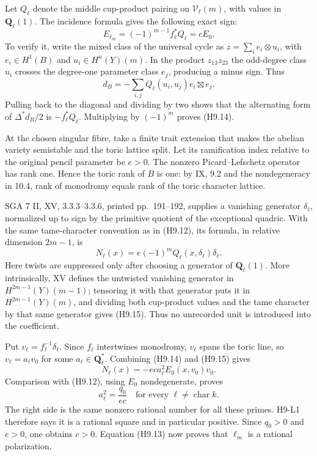 Let $Q_\ell$ denote the middle cup-product pairing on
$\mathcal V_\ell(m)$, with values in $\mathbf Q_\ell(1)$.
The incidence formula gives the following exact sign:
\[
 E_{\ell_m}=(-1)^{m-1}f_\ell^*Q_\ell=cE_0.            \tag{H9.14}
\]
To verify it, write the mixed class of the universal cycle as
$z=\sum_i e_i\otimes u_i$, with $e_i\in H^1(B)$ and
$u_i\in H^n(Y)(m)$. In the product $z_{13}z_{23}$ the odd-degree
class $u_i$ crosses the degree-one parameter class $e_j$, producing
a minus sign. Thus
\[
 d_B=-\sum_{i,j}Q_\ell(u_i,u_j)e_i\boxtimes e_j.
\]
Pulling back to the diagonal and dividing by two shows that the
alternating form of $\Delta^*d_B/2$ is $-f_\ell^*Q_\ell$.
Multiplying by $(-1)^m$ proves (H9.14).

At the chosen singular fibre, take a finite trait extension that makes
the abelian variety semistable and the toric lattice split. Let its
ramification index relative to the original pencil parameter be $e>0$.
The nonzero Picard--Lefschetz operator has rank one. Hence the toric rank
of $B$ is one: by IX, 9.2 and the nondegeneracy in 10.4, rank of monodromy
equals rank of the toric character lattice.

SGA 7 II, XV, 3.3.3--3.3.6, printed pp.~191--192, supplies a vanishing generator
$\delta_\ell$, normalized up to sign by the primitive quotient of the
exceptional quadric. With the same tame-character convention as in
(H9.12), its formula, in relative dimension $2m-1$, is
\[
 N_\ell(x)=e(-1)^m Q_\ell(x,\delta_\ell)\delta_\ell.
                                                        \tag{H9.15}
\]
Here twists are suppressed only after choosing a generator of
$\mathbf Q_\ell(1)$. More intrinsically, XV defines the untwisted
vanishing generator in $H^{2m-1}(Y)(m-1)$; tensoring it with that
generator puts it in $H^{2m-1}(Y)(m)$, and dividing both cup-product
values and the tame character by that same generator gives (H9.15).
Thus no unrecorded unit is introduced into the coefficient.

Put $v_\ell=f_\ell^{-1}\delta_\ell$. Since $f_\ell$ intertwines
monodromy, $v_\ell$ spans the toric line, so
$v_\ell=a_\ell v_0$ for some $a_\ell\in\mathbf Q_\ell^*$.
Combining (H9.14) and (H9.15) gives
\[
 N_\ell(x)=-e c a_\ell^2 E_0(x,v_0)v_0.
\]
Comparison with (H9.12), using $E_0$ nondegenerate, proves
\[
 a_\ell^2=\frac{q_0}{e c}\quad\text{for every }\ell\ne
 \operatorname{char}k.                                \tag{H9.16}
\]
The right side is the same nonzero rational number for all these primes.
H9-L1 therefore says it is a rational square and in particular positive.
Since $q_0>0$ and $e>0$, one obtains $c>0$. Equation (H9.13) now proves
that $\ell_m$ is a rational polarization.

